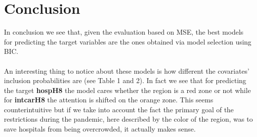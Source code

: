 \documentclass[12pt,a4paper]{article}
\theoremstyle{definition}
\theoremstyle{remark}
\begin{document}
\section{Conclusion}
In conclusion we see that, given the evaluation based on MSE, the best models for predicting the target variables are the ones obtained via model selection using BIC. \\\\
An interesting thing to notice about these models is how different the covariates' inclusion probabilities are (see Table 1 and 2). In fact we see that for predicting the target \textbf{hospH8} the model cares whether the region is a red zone or not while for \textbf{intcarH8} the attention is shifted on the orange zone. This seems counterintuitive but if we take into account the fact the primary goal of the restrictions during the pandemic, here described by the color of the region, was to save hospitals from being overcrowded, it actually makes sense.
\clearpage
\end{document}
